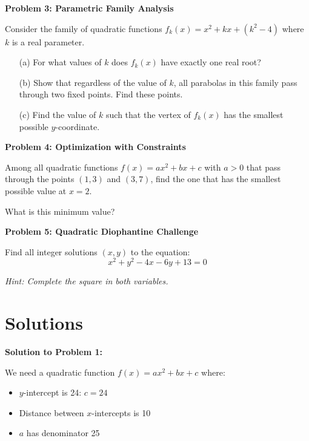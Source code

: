 \documentclass[12pt]{article}
\begin{document}
\vspace{5cm}

\textbf{Problem 3: Parametric Family Analysis}

Consider the family of quadratic functions $f_k(x) = x^2 + kx + (k^2 - 4)$ where $k$ is a real parameter.

\begin{enumerate}
\item[(a)] For what values of $k$ does $f_k(x)$ have exactly one real root?
\vspace{2cm}

\item[(b)] Show that regardless of the value of $k$, all parabolas in this family pass through two fixed points. Find these points.
\vspace{3cm}

\item[(c)] Find the value of $k$ such that the vertex of $f_k(x)$ has the smallest possible $y$-coordinate.
\vspace{3cm}
\end{enumerate}

\newpage

\textbf{Problem 4: Optimization with Constraints}

Among all quadratic functions $f(x) = ax^2 + bx + c$ with $a > 0$ that pass through the points $(1, 3)$ and $(3, 7)$, find the one that has the smallest possible value at $x = 2$.

What is this minimum value?

\vspace{4cm}

\textbf{Problem 5: Quadratic Diophantine Challenge}

Find all integer solutions $(x, y)$ to the equation:
$$x^2 + y^2 - 4x - 6y + 13 = 0$$

\textit{Hint: Complete the square in both variables.}

\vspace{4cm}

\newpage

\section{Solutions}

\textbf{Solution to Problem 1:}

We need a quadratic function $f(x) = ax^2 + bx + c$ where:
\begin{itemize}
\item $y$-intercept is 24: $c = 24$
\item Distance between $x$-intercepts is 10
\item $a$ has denominator 25
\end{itemize}
\end{document}
